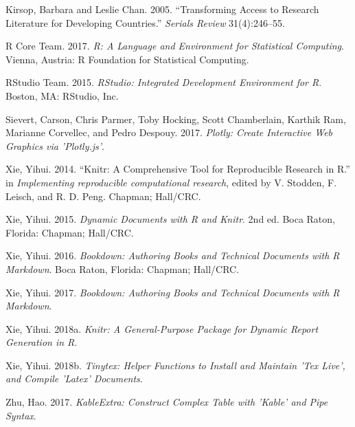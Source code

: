 \documentclass[12pt,]{article}
\theoremstyle{definition}
\theoremstyle{definition}
\theoremstyle{definition}
\theoremstyle{remark}
\begin{document}
\hypertarget{ref-Kirsop2005-ro}{}
Kirsop, Barbara and Leslie Chan. 2005. ``Transforming Access to Research
Literature for Developing Countries.'' \emph{Serials Review}
31(4):246--55.

\hypertarget{ref-R2017}{}
R Core Team. 2017. \emph{R: A Language and Environment for Statistical
Computing}. Vienna, Austria: R Foundation for Statistical Computing.

\hypertarget{ref-Rstudio2015}{}
RStudio Team. 2015. \emph{RStudio: Integrated Development Environment
for R}. Boston, MA: RStudio, Inc.

\hypertarget{ref-plotly}{}
Sievert, Carson, Chris Parmer, Toby Hocking, Scott Chamberlain, Karthik
Ram, Marianne Corvellec, and Pedro Despouy. 2017. \emph{Plotly: Create
Interactive Web Graphics via 'Plotly.js'}.

\hypertarget{ref-knitr3}{}
Xie, Yihui. 2014. ``Knitr: A Comprehensive Tool for Reproducible
Research in R.'' in \emph{Implementing reproducible computational
research}, edited by V. Stodden, F. Leisch, and R. D. Peng. Chapman;
Hall/CRC.

\hypertarget{ref-knitr2}{}
Xie, Yihui. 2015. \emph{Dynamic Documents with R and Knitr}. 2nd ed.
Boca Raton, Florida: Chapman; Hall/CRC.

\hypertarget{ref-bookdown2}{}
Xie, Yihui. 2016. \emph{Bookdown: Authoring Books and Technical
Documents with R Markdown}. Boca Raton, Florida: Chapman; Hall/CRC.

\hypertarget{ref-bookdown1}{}
Xie, Yihui. 2017. \emph{Bookdown: Authoring Books and Technical
Documents with R Markdown}.

\hypertarget{ref-knitr1}{}
Xie, Yihui. 2018a. \emph{Knitr: A General-Purpose Package for Dynamic
Report Generation in R}.

\hypertarget{ref-tinytex}{}
Xie, Yihui. 2018b. \emph{Tinytex: Helper Functions to Install and
Maintain 'Tex Live', and Compile 'Latex' Documents}.

\hypertarget{ref-kableextra}{}
Zhu, Hao. 2017. \emph{KableExtra: Construct Complex Table with 'Kable'
and Pipe Syntax}.
\end{document}
